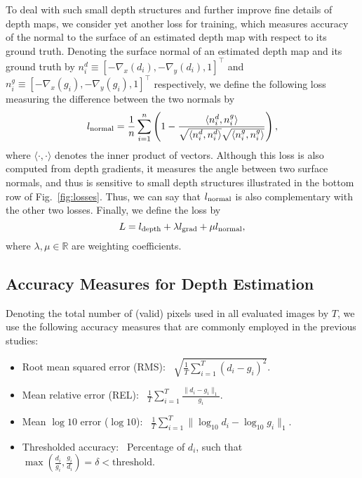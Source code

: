 \documentclass[10pt,twocolumn,letterpaper]{article}
\begin{document}
To deal with such small depth structures and further improve fine details of depth maps, we consider yet another loss for training, which measures accuracy of the normal to the surface of an estimated depth map with respect to its ground truth. Denoting the surface normal of an estimated depth map and its ground truth by $n^d_i\equiv [-\nabla_{x}(d_{i}), -\nabla_{y}(d_{i}),1]^\top$ and ${n^g_i\equiv [-\nabla_{x}(g_{i}), -\nabla_{y}(g_{i}),1]^\top}$
respectively, we define the following loss measuring the difference between the two normals by
\begin{equation}
    l_{\rm normal} = \frac{1}{n}\sum_{i=1}^n
    \left(
        1-\frac{\langle n^d_i,n^g_i \rangle}{
            \sqrt{\langle n^d_i,n^d_i \rangle}
            \sqrt{\langle n^g_i,n^g_i \rangle}
        }
    \right),
\end{equation}
where $\langle\cdot,\cdot\rangle$ denotes the inner product of vectors. 
Although this loss is also  computed from depth gradients, it measures the angle between two surface normals, and thus is sensitive to small depth structures illustrated in the bottom row of Fig.~\ref{fig:losses}. 
Thus, we can say that $l_{\rm normal}$ is also complementary with the other two losses. Finally, we define the loss by
\begin{equation}
    L = l_{\rm depth} +  \lambda  l_{\rm grad} + \mu l_{\rm normal},
\end{equation}
where $\lambda, \mu \in \mathbb{R}$ are weighting coefficients. 

\subsection{Accuracy Measures for Depth Estimation}
Denoting the total number of (valid) pixels used in all evaluated images by $T$, we use the following accuracy measures that are commonly employed in the previous studies:
\begin{itemize} 
 \item Root mean squared error (RMS):~ $\sqrt{\frac{1}{T}\sum \limits_{i=1}^{T} (d_{i} - g_{i})^{2}}$.
 \item Mean relative error (REL):~ $\frac{1}{T}\sum \limits_{i=1}^{T} \frac{\|d_{i} - g_{i}\|_1}{g_{i}}$.
 \item Mean $\log10$ error ($\log10$):~ $\frac{1}{T}\sum \limits_{i=1}^{T} {\|\log_{10} d_{i} - \log_{10} g_{i}\|_1}$.
 \item Thresholded accuracy:~ Percentage of $d_{i}$, such that ${\max\left(\frac{d_{i}}{g_{i}},\frac{g_{i}}{d_{i}}\right) = \delta < \mbox{threshold}}$.
\end{itemize}
\end{document}

